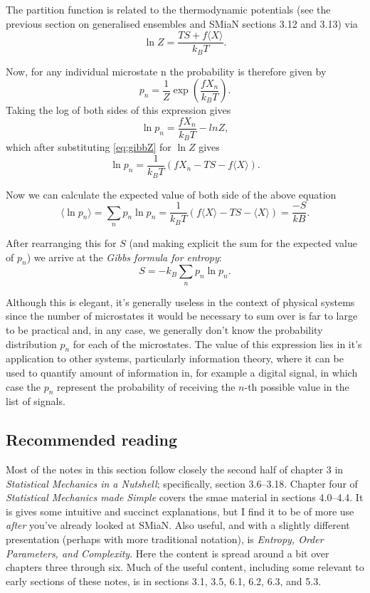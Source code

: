 The partition function is related to the thermodynamic potentials (see the previous section on generalised ensembles and SMiaN sections 3.12 and 3.13) via
\begin{equation}
	\ln Z = \frac{TS+f\langle X\rangle}{k_BT}.
	\label{eq:gibbZ}
\end{equation}

Now, for any individual microstate n the probability is therefore given by
$$
	p_n = \frac{1}{Z}\exp\left(\frac{fX_n}{k_BT}\right).
$$
Taking the log of both sides of this expression gives
$$
	\ln p_n = \frac{fX_n}{k_BT} - ln Z,
$$
which after substituting \ref{eq:gibbZ} for $\ln Z$ gives
$$
	\ln p_n = \frac{1}{k_BT}(fX_n -TS -f\langle X\rangle).
$$

Now we can calculate the expected value of both side of the above equation
$$
	\langle \ln p_n \rangle = \sum_n p_n\ln p_n = \frac{1}{k_BT}(f\langle X\rangle -TS -\langle X \rangle) = \frac{-S}{kB}.
$$

After rearranging this for $S$ (and making explicit the sum for the expected value of $p_n$) we arrive at the \emph{Gibbs formula for entropy}:
$$
	S = -k_B\sum_np_n\ln p_n.
$$

Although this is elegant, it's generally useless in the context of physical systems since the number of microstates it would be necessary to sum over is far to large to be practical and, in any case, we generally don't know the probability distribution $p_n$ for each of the microstates. The value of this expression lies in it's application to other systems, particularly information theory, where it can be used to quantify amount of information in, for example a digital signal, in which case the $p_n$ represent the probability of receiving the $n$-th possible value in the list of signals.

\subsection*{Recommended reading}
Most of the notes in this section follow closely the second half of chapter 3 in \emph{Statistical Mechanics in a Nutshell}; specifically, section 3.6--3.18. Chapter four of \emph{Statistical Mechanics made Simple} covers the smae material in sections 4.0--4.4. It is gives some intuitive and succinct explanations, but I find it to be of more use \emph{after} you've already looked at SMiaN. Also useful, and with a slightly different presentation (perhaps with more traditional notation), is \emph{Entropy, Order Parameters, and Complexity}. Here the content is spread around a bit over chapters three through six. Much of the useful content, including some relevant to early sections of these notes, is in sections 3.1, 3.5, 6.1, 6.2, 6.3, and 5.3.
